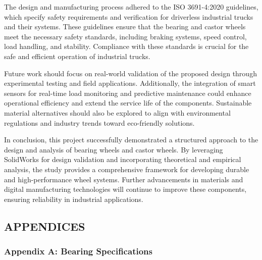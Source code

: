 \documentclass[../../main]{subfiles}
\begin{document}
The design and manufacturing process adhered to the ISO 3691-4:2020
guidelines, which specify safety requirements and verification for
driverless industrial trucks and their systems. These guidelines ensure
that the bearing and castor wheels meet the necessary safety standards,
including braking systems, speed control, load handling, and stability.
Compliance with these standards is crucial for the safe and efficient
operation of industrial trucks.

Future work should focus on real-world validation of the proposed design
through experimental testing and field applications. Additionally, the
integration of smart sensors for real-time load monitoring and
predictive maintenance could enhance operational efficiency and extend
the service life of the components. Sustainable material alternatives
should also be explored to align with environmental regulations and
industry trends toward eco-friendly solutions.

In conclusion, this project successfully demonstrated a structured
approach to the design and analysis of bearing wheels and castor wheels.
By leveraging SolidWorks for design validation and incorporating
theoretical and empirical analysis, the study provides a comprehensive
framework for developing durable and high-performance wheel systems.
Further advancements in materials and digital manufacturing technologies
will continue to improve these components, ensuring reliability in
industrial applications.

\subsection{}\label{section-5}

\subsection{}\label{section-6}

\subsection{\texorpdfstring{\textbf{APPENDICES}}{APPENDICES}}\label{appendices}

\subsubsection{\texorpdfstring{\textbf{Appendix A: Bearing
Specifications}}{Appendix A: Bearing Specifications}}\label{appendix-a-bearing-specifications}
\end{document}

